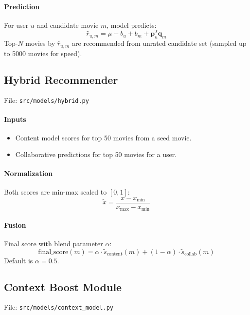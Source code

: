 \documentclass[11pt,a4paper]{article}
\begin{document}
\paragraph{Prediction}
For user $u$ and candidate movie $m$, model predicts:
\begin{equation}
\hat r_{u,m} = \mu + b_u + b_m + \mathbf{p}_u^T \mathbf{q}_m
\end{equation}
Top-$N$ movies by $\hat r_{u,m}$ are recommended from unrated candidate set (sampled up to 5000 movies for speed).

\subsection{Hybrid Recommender}
File: \texttt{src/models/hybrid.py}

\paragraph{Inputs}
\begin{itemize}[leftmargin=1.5em]
    \item Content model scores for top 50 movies from a seed movie.
    \item Collaborative predictions for top 50 movies for a user.
\end{itemize}

\paragraph{Normalization}
Both scores are min-max scaled to $[0,1]$:
\begin{equation}
\tilde x = \frac{x - x_{\min}}{x_{\max} - x_{\min}}
\end{equation}

\paragraph{Fusion}
Final score with blend parameter $\alpha$:
\begin{equation}
\text{final\_score}(m) = \alpha \cdot \tilde s_{\text{content}}(m) + (1-\alpha) \cdot \tilde s_{\text{collab}}(m)
\end{equation}
Default is $\alpha = 0.5$.

\subsection{Context Boost Module}
File: \texttt{src/models/context\_model.py}
\end{document}

